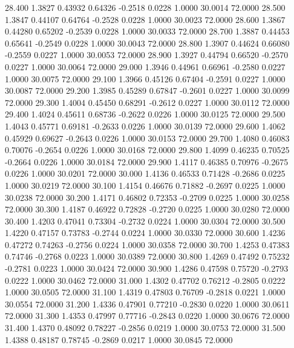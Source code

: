   28.400   1.3827   0.43932   0.64326  -0.2518   0.0228   1.0000  30.0014  72.0000
  28.500   1.3847   0.44107   0.64764  -0.2528   0.0228   1.0000  30.0023  72.0000
  28.600   1.3867   0.44280   0.65202  -0.2539   0.0228   1.0000  30.0033  72.0000
  28.700   1.3887   0.44453   0.65641  -0.2549   0.0228   1.0000  30.0043  72.0000
  28.800   1.3907   0.44624   0.66080  -0.2559   0.0227   1.0000  30.0053  72.0000
  28.900   1.3927   0.44794   0.66520  -0.2570   0.0227   1.0000  30.0064  72.0000
  29.000   1.3946   0.44961   0.66961  -0.2580   0.0227   1.0000  30.0075  72.0000
  29.100   1.3966   0.45126   0.67404  -0.2591   0.0227   1.0000  30.0087  72.0000
  29.200   1.3985   0.45289   0.67847  -0.2601   0.0227   1.0000  30.0099  72.0000
  29.300   1.4004   0.45450   0.68291  -0.2612   0.0227   1.0000  30.0112  72.0000
  29.400   1.4024   0.45611   0.68736  -0.2622   0.0226   1.0000  30.0125  72.0000
  29.500   1.4043   0.45771   0.69181  -0.2633   0.0226   1.0000  30.0139  72.0000
  29.600   1.4062   0.45929   0.69627  -0.2643   0.0226   1.0000  30.0153  72.0000
  29.700   1.4080   0.46083   0.70076  -0.2654   0.0226   1.0000  30.0168  72.0000
  29.800   1.4099   0.46235   0.70525  -0.2664   0.0226   1.0000  30.0184  72.0000
  29.900   1.4117   0.46385   0.70976  -0.2675   0.0226   1.0000  30.0201  72.0000
  30.000   1.4136   0.46533   0.71428  -0.2686   0.0225   1.0000  30.0219  72.0000
  30.100   1.4154   0.46676   0.71882  -0.2697   0.0225   1.0000  30.0238  72.0000
  30.200   1.4171   0.46802   0.72353  -0.2709   0.0225   1.0000  30.0258  72.0000
  30.300   1.4187   0.46922   0.72828  -0.2720   0.0225   1.0000  30.0280  72.0000
  30.400   1.4203   0.47041   0.73304  -0.2732   0.0224   1.0000  30.0304  72.0000
  30.500   1.4220   0.47157   0.73783  -0.2744   0.0224   1.0000  30.0330  72.0000
  30.600   1.4236   0.47272   0.74263  -0.2756   0.0224   1.0000  30.0358  72.0000
  30.700   1.4253   0.47383   0.74746  -0.2768   0.0223   1.0000  30.0389  72.0000
  30.800   1.4269   0.47492   0.75232  -0.2781   0.0223   1.0000  30.0424  72.0000
  30.900   1.4286   0.47598   0.75720  -0.2793   0.0222   1.0000  30.0462  72.0000
  31.000   1.4302   0.47702   0.76212  -0.2805   0.0222   1.0000  30.0505  72.0000
  31.100   1.4319   0.47803   0.76709  -0.2818   0.0221   1.0000  30.0554  72.0000
  31.200   1.4336   0.47901   0.77210  -0.2830   0.0220   1.0000  30.0611  72.0000
  31.300   1.4353   0.47997   0.77716  -0.2843   0.0220   1.0000  30.0676  72.0000
  31.400   1.4370   0.48092   0.78227  -0.2856   0.0219   1.0000  30.0753  72.0000
  31.500   1.4388   0.48187   0.78745  -0.2869   0.0217   1.0000  30.0845  72.0000
